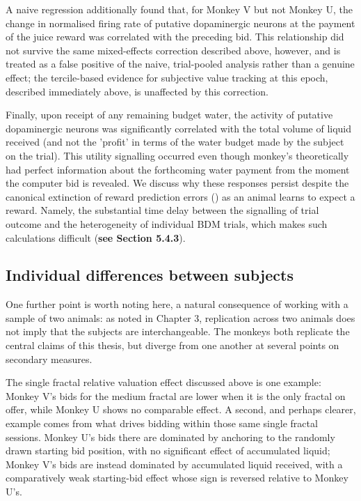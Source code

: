 A naive regression additionally found that, for Monkey V but not Monkey U, the change in normalised firing rate of putative dopaminergic neurons at the payment of the juice reward was correlated with the preceding bid. This relationship did not survive the same mixed-effects correction described above, however, and is treated as a false positive of the naive, trial-pooled analysis rather than a genuine effect; the tercile-based evidence for subjective value tracking at this epoch, described immediately above, is unaffected by this correction.

Finally, upon receipt of any remaining budget water, the activity of putative dopaminergic neurons was significantly correlated with the total volume of liquid received (and not the 'profit' in terms of the water budget made by the subject on the trial). This utility signalling occurred even though monkey's theoretically had perfect information about the forthcoming water payment from the moment the computer bid is revealed. We discuss why these responses persist despite the canonical extinction of reward prediction errors (\cite{schultzNeuralSubstratePrediction1997}) as an animal learns to expect a reward. Namely, the substantial time delay between the signalling of trial outcome and the heterogeneity of individual BDM trials, which makes such calculations difficult (\textbf{see Section 5.4.3}).

\subsection{Individual differences between subjects}

One further point is worth noting here, a natural consequence of working with a sample of two animals: as noted in Chapter 3, replication across two animals does not imply that the subjects are interchangeable. The monkeys both replicate the central claims of this thesis, but diverge from one another at several points on secondary measures.

The single fractal relative valuation effect discussed above is one example: Monkey V's bids for the medium fractal are lower when it is the only fractal on offer, while Monkey U shows no comparable effect. A second, and perhaps clearer, example comes from what drives bidding within those same single fractal sessions. Monkey U's bids there are dominated by anchoring to the randomly drawn starting bid position, with no significant effect of accumulated liquid; Monkey V's bids are instead dominated by accumulated liquid received, with a comparatively weak starting-bid effect whose sign is reversed relative to Monkey U's.

